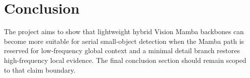 \section{Conclusion}

The project aims to show that lightweight hybrid Vision Mamba backbones can become more suitable for aerial small-object detection when the Mamba path is reserved for low-frequency global context and a minimal detail branch restores high-frequency local evidence. The final conclusion section should remain scoped to that claim boundary.


